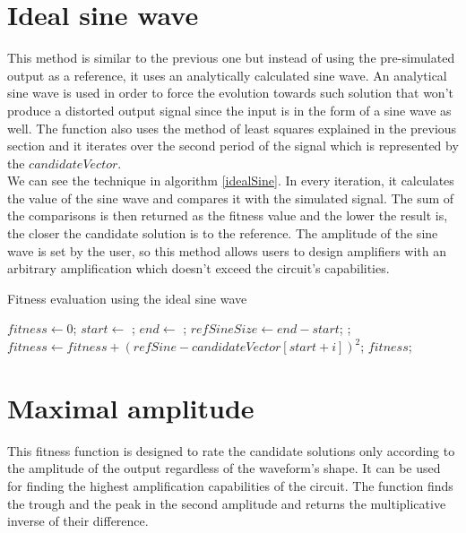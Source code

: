 \section{Ideal sine wave}
This method is similar to the previous one but instead of using the pre-simulated output as a reference, it uses an analytically calculated sine wave. An analytical sine wave is used in order to force the evolution towards such solution that won't produce a distorted output signal since the input is in the form of a sine wave as well. The function also uses the method of least squares explained in the previous section and it iterates over the second period of the signal which is represented by the $candidateVector$.\\
We can see the technique in algorithm \ref{idealSine}. In every iteration, it calculates the value of the sine wave and compares it with the simulated signal. The sum of the comparisons is then returned as the fitness value and the lower the result is, the closer the candidate solution is to the reference. The amplitude of the sine wave is set by the user, so this method allows users to design amplifiers with an arbitrary amplification which doesn't exceed the circuit's capabilities.

\begin{algorithm}[H]
\caption{Fitness evaluation using the ideal sine wave}
\label{idealSine}
\begin{algorithmic}[1]
        \State $fitness \gets 0$;
        \State $start \gets$ ;
        \State $end \gets$ ;
        \State $refSineSize \gets end - start$;
           \State {};
           \State $fitness \gets fitness + (refSine - candidateVector[start + i])^2$;
        \EndFor
        \State \Return $fitness$;
    \EndFunction
\end{algorithmic}
\end{algorithm}

\section{Maximal amplitude}
This fitness function is designed to rate the candidate solutions only according to the amplitude of the output regardless of the waveform's shape. It can be used for finding the highest amplification capabilities of the circuit. The function finds the trough and the peak in the second amplitude and returns the multiplicative inverse of their difference.


